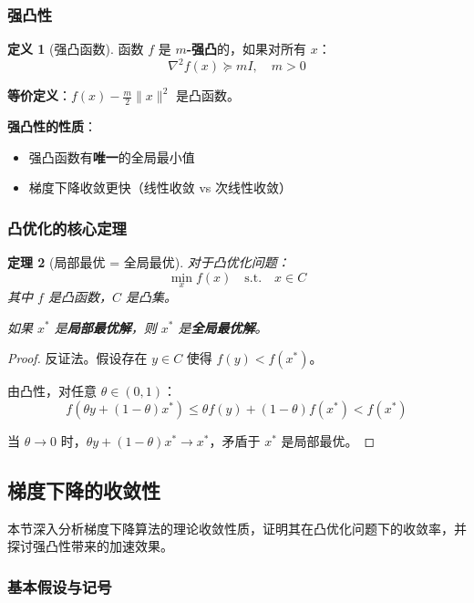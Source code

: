 \documentclass[10pt]{article}
\numberwithin{equation}{section}
\theoremstyle{plain}
\newtheorem{theorem}{定理}[section]
\theoremstyle{definition}
\newtheorem{definition}[theorem]{定义}
\theoremstyle{remark}
\newcommand{\norm}[1]{\lVert #1 \rVert}
\begin{document}
\subsubsection{强凸性}

\begin{definition}[强凸函数]
	函数 $f$ 是 \textbf{$m$-强凸}的，如果对所有 $x$：
	\[\nabla^2 f(x) \succeq m I, \quad m > 0\]
\end{definition}

\textbf{等价定义}：$f(x) - \frac{m}{2}\norm{x}^2$ 是凸函数。

\begin{RemarkBox}
	\textbf{强凸性的性质}：
	\begin{itemize}
		\item 强凸函数有\textbf{唯一}的全局最小值
		\item 梯度下降收敛更快（线性收敛 vs 次线性收敛）
	\end{itemize}
\end{RemarkBox}

\subsubsection{凸优化的核心定理}

\begin{theorem}[局部最优 = 全局最优]
	对于凸优化问题：
	\[\min_x f(x) \quad \text{s.t.} \quad x \in C\]
	其中 $f$ 是凸函数，$C$ 是凸集。

	如果 $x^*$ 是\textbf{局部最优解}，则 $x^*$ 是\textbf{全局最优解}。
\end{theorem}

\begin{proof}
	反证法。假设存在 $y \in C$ 使得 $f(y) < f(x^*)$。

	由凸性，对任意 $\theta \in (0, 1)$：
	\[f(\theta y + (1-\theta) x^*) \leq \theta f(y) + (1-\theta) f(x^*) < f(x^*)\]

	当 $\theta \to 0$ 时，$\theta y + (1-\theta) x^* \to x^*$，矛盾于 $x^*$ 是局部最优。
\end{proof}

\subsection{梯度下降的收敛性}

本节深入分析梯度下降算法的理论收敛性质，证明其在凸优化问题下的收敛率，并探讨强凸性带来的加速效果。

\subsubsection{基本假设与记号}
\end{document}
